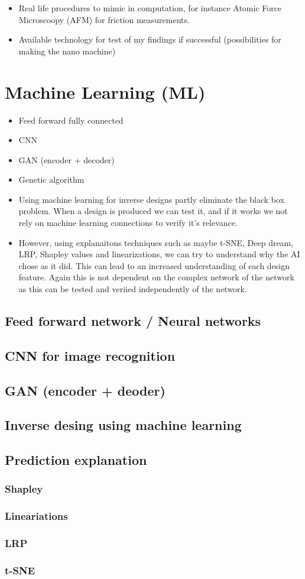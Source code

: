 \begin{itemize}
  \item Real life procedures to mimic in computation, for instance Atomic Force
  Microscoopy (AFM) for friction measurements.
  \item Available technology for test of my findings if successful
  (possibilities for making the nano machine) 
\end{itemize}


\section{Machine Learning (ML)}
\begin{itemize}
  \item Feed forward fully connected
  \item CNN
  \item GAN (encoder + decoder)
  \item Genetic algorithm
  \item Using machine learning for inverse designs partly eliminate the black
  box problem. When a design is produced we can test it, and if it works we not
  rely on machine learning connections to verify it's relevance. 
  \item However, using explanaitons techniques such as maybe t-SNE, Deep dream,
  LRP, Shapley values and linearizations, we can try to understand why the AI
  chose as it did. This can lead to an increased understanding of each design
  feature. Again this is not dependent on the complex network of the network as
  this can be tested and veriied independently of the network. 
\end{itemize}

\subsection{Feed forward network / Neural networks}
\subsection{CNN for image recognition}
\subsection{GAN (encoder + deoder)}
\subsection{Inverse desing using machine learning}
\subsection{Prediction explanation}
\subsubsection{Shapley}
\subsubsection{Lineariations}
\subsubsection{LRP}
\subsubsection{t-SNE}



